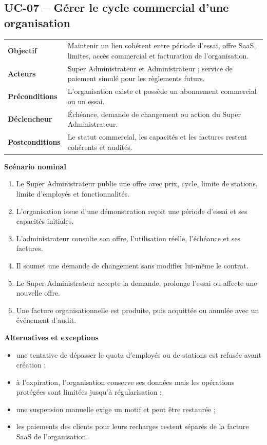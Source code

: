 \subsection{UC-07 -- Gérer le cycle commercial d'une organisation}

\begin{table}[H]
  \centering
  \begin{tabularx}{\textwidth}{@{}C{3.3cm}Y@{}}
    \toprule
    \textbf{Objectif} & Maintenir un lien cohérent entre période d'essai, offre SaaS,
    limites, accès commercial et facturation de l'organisation.\\
    \textbf{Acteurs} & Super Administrateur et Administrateur ; service de paiement
    simulé pour les règlements futurs.\\
    \textbf{Préconditions} & L'organisation existe et possède un abonnement
    commercial ou un essai.\\
    \textbf{Déclencheur} & Échéance, demande de changement ou action du Super
    Administrateur.\\
    \textbf{Postconditions} & Le statut commercial, les capacités et les factures
    restent cohérents et audités.\\
    \bottomrule
  \end{tabularx}
\end{table}

\textbf{Scénario nominal}
\begin{enumerate}[leftmargin=8mm]
  \item Le Super Administrateur publie une offre avec prix, cycle, limite de stations,
  limite d'employés et fonctionnalités.
  \item L'organisation issue d'une démonstration reçoit une période d'essai et ses
  capacités initiales.
  \item L'administrateur consulte son offre, l'utilisation réelle, l'échéance et ses
  factures.
  \item Il soumet une demande de changement sans modifier lui-même le contrat.
  \item Le Super Administrateur accepte la demande, prolonge l'essai ou affecte une
  nouvelle offre.
  \item Une facture organisationnelle est produite, puis acquittée ou annulée avec
  un événement d'audit.
\end{enumerate}

\textbf{Alternatives et exceptions}
\begin{itemize}[leftmargin=7mm]
  \item une tentative de dépasser le quota d'employés ou de stations est refusée avant
  création ;
  \item à l'expiration, l'organisation conserve ses données mais les opérations
  protégées sont limitées jusqu'à régularisation ;
  \item une suspension manuelle exige un motif et peut être restaurée ;
  \item les paiements des clients pour leurs recharges restent séparés de la facture
  SaaS de l'organisation.
\end{itemize}


